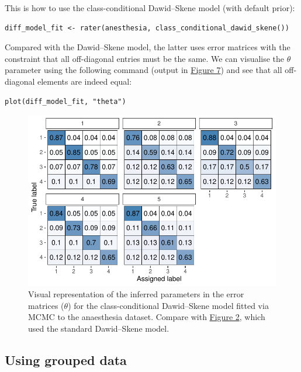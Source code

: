 This is how to use the class-conditional Dawid--Skene model (with default prior):

\begin{verbatim}
diff_model_fit <- rater(anesthesia, class_conditional_dawid_skene())
\end{verbatim}

Compared with the Dawid--Skene model, the latter uses error matrices with the
constraint that all off-diagonal entries must be the same. We can visualise
the \(\theta\) parameter using the following command (output in
\protect\hyperlink{fig:plot-theta-diff-model}{Figure 7}) and see that all off-diagonal elements are
indeed equal:

\begin{verbatim}
plot(diff_model_fit, "theta")
\end{verbatim}

\begin{figure}

{\centering \includegraphics{RJ-2023-064_files/figure-latex/plot-theta-diff-model-1} 

}

\caption{Visual representation of the inferred parameters in the error matrices ($\theta$) for the class-conditional Dawid--Skene model fitted via MCMC to the anaesthesia dataset.  Compare with \protect\hyperlink{fig:plot-theta}{Figure 2}, which used the standard Dawid--Skene model.}\label{fig:plot-theta-diff-model}
\end{figure}

\hypertarget{sec:using-grouped-data}{%
\subsection{Using grouped data}\label{sec:using-grouped-data}}


